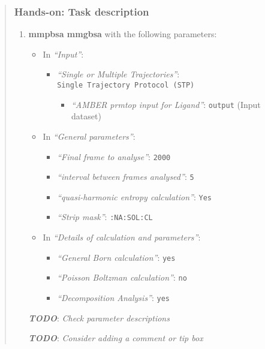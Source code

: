 \documentclass[twocolumn]{bmcart}%
\providecommand{\tightlist}{%
  \setlength{\itemsep}{0pt}\setlength{\parskip}{0pt}}
\providecommand{\tightlist}{%
  \setlength{\itemsep}{0pt}\setlength{\parskip}{0pt}}
\begin{document}
\begin{quote}
\hypertarget{hands-on-task-description-18}{%
\subsubsection{Hands-on: Task
description}\label{hands-on-task-description-18}}

\begin{enumerate}
\def\labelenumi{\arabic{enumi}.}
\tightlist
\item
  \textbf{mmpbsa mmgbsa} with the following parameters:

  \begin{itemize}
  \tightlist
  \item
    In \emph{``Input''}:

    \begin{itemize}
    \tightlist
    \item
      \emph{``Single or Multiple Trajectories''}:
      \texttt{Single\ Trajectory\ Protocol\ (STP)}

      \begin{itemize}
      \tightlist
      \item
        \emph{``AMBER prmtop input for Ligand''}: \texttt{output} (Input
        dataset)
      \end{itemize}
    \end{itemize}
  \item
    In \emph{``General parameters''}:

    \begin{itemize}
    \item
      \emph{``Final frame to analyse''}: \texttt{2000}
    \item
      \emph{``interval between frames analysed''}: \texttt{5}
    \item
      \emph{``quasi-harmonic entropy calculation''}: \texttt{Yes}
    \item
      \emph{``Strip mask''}: \texttt{:NA:SOL:CL}
    \end{itemize}
  \item
    In \emph{``Details of calculation and parameters''}:

    \begin{itemize}
    \tightlist
    \item
      \emph{``General Born calculation''}: \texttt{yes}
    \item
      \emph{``Poisson Boltzman calculation''}: \texttt{no}
    \item
      \emph{``Decomposition Analysis''}: \texttt{yes}
    \end{itemize}
  \end{itemize}

  \textbf{\emph{TODO}}: \emph{Check parameter descriptions}

  \textbf{\emph{TODO}}: \emph{Consider adding a comment or tip box}
\end{enumerate}


\end{quote}
\end{document}
